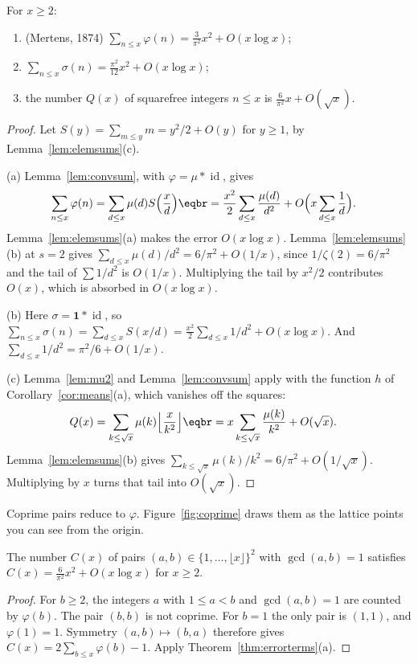 \begin{theorem}\label{thm:errorterms}
For $x\ge2$:
\begin{enumerate}[label=(\alph*)]
\item (Mertens, 1874) $\displaystyle\sum_{n\le x}\varphi(n)=\frac3{\pi^2}x^2+O(x\log x)$;
\item $\displaystyle\sum_{n\le x}\sigma(n)=\frac{\pi^2}{12}x^2+O(x\log x)$;
\item the number $Q(x)$ of squarefree integers $n\le x$ is $\frac6{\pi^2}x+O(\sqrt x)$.
\end{enumerate}
\end{theorem}
\begin{proof}
Let $S(y)=\sum_{m\le y}m=y^2/2+O(y)$ for $y\ge1$, by Lemma~\ref{lem:elemsums}(c).

(a) Lemma~\ref{lem:convsum}, with $\varphi=\mu*\operatorname{id}$, gives
\[
\begin{aligned}\sum_{n\le x}\varphi(n)&=\sum_{d\le x}\mu(d)S\Bigl(\frac xd\Bigr)\eqbr=\frac{x^2}2\sum_{d\le x}\frac{\mu(d)}{d^2}+O\Bigl(x\sum_{d\le x}\frac1d\Bigr).\end{aligned}
\]
Lemma~\ref{lem:elemsums}(a) makes the error $O(x\log x)$. Lemma~\ref{lem:elemsums}(b) at $s=2$ gives $\sum_{d\le x}\mu(d)/d^2=6/\pi^2+O(1/x)$, since $1/\zeta(2)=6/\pi^2$ and the tail of $\sum 1/d^2$ is $O(1/x)$. Multiplying the tail by $x^2/2$ contributes $O(x)$, which is absorbed in $O(x\log x)$.

(b) Here $\sigma=\mathbf1*\operatorname{id}$, so $\sum_{n\le x}\sigma(n)=\sum_{d\le x}S(x/d)=\frac{x^2}2\sum_{d\le x}1/d^2+O(x\log x)$. And $\sum_{d\le x}1/d^2=\pi^2/6+O(1/x)$.

(c) Lemma~\ref{lem:mu2} and Lemma~\ref{lem:convsum} apply with the function $h$ of Corollary~\ref{cor:means}(a), which vanishes off the squares:
\[
\begin{aligned}Q(x)&=\sum_{k\le\sqrt x}\mu(k)\Bigl\lfloor\frac x{k^2}\Bigr\rfloor\eqbr=x\sum_{k\le\sqrt x}\frac{\mu(k)}{k^2}+O(\sqrt x).\end{aligned}
\]
Lemma~\ref{lem:elemsums}(b) gives $\sum_{k\le\sqrt x}\mu(k)/k^2=6/\pi^2+O(1/\sqrt x)$. Multiplying by $x$ turns that tail into $O(\sqrt x)$.
\end{proof}

Coprime pairs reduce to $\varphi$. Figure~\ref{fig:coprime} draws them as the lattice points you can see from the origin.

\begin{corollary}\label{cor:coprimepairs}
The number $C(x)$ of pairs $(a,b)\in\{1,\dots,\lfloor x\rfloor\}^2$ with $\gcd(a,b)=1$ satisfies $C(x)=\frac6{\pi^2}x^2+O(x\log x)$ for $x\ge2$.
\end{corollary}
\begin{proof}
For $b\ge2$, the integers $a$ with $1\le a<b$ and $\gcd(a,b)=1$ are counted by $\varphi(b)$. The pair $(b,b)$ is not coprime. For $b=1$ the only pair is $(1,1)$, and $\varphi(1)=1$. Symmetry $(a,b)\mapsto(b,a)$ therefore gives $C(x)=2\sum_{b\le x}\varphi(b)-1$. Apply Theorem~\ref{thm:errorterms}(a).
\end{proof}

